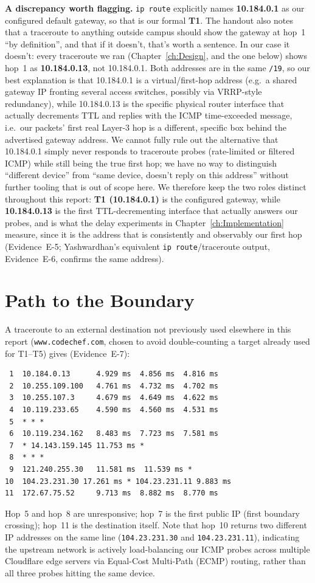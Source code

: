 \textbf{A discrepancy worth flagging.} \texttt{ip route} explicitly names \textbf{10.184.0.1} as
our configured default gateway, so that is our formal \textbf{T1}. The handout also notes that a
traceroute to anything outside campus should show the gateway at hop~1 ``by definition'', and
that if it doesn't, that's worth a sentence. In our case it doesn't: every traceroute we ran
(Chapter~\ref{ch:Design}, and the one below) shows hop~1 as \textbf{10.184.0.13}, not 10.184.0.1.
Both addresses are in the same \texttt{/19}, so our best explanation is that 10.184.0.1 is a
virtual/first-hop address (e.g.\ a shared gateway IP fronting several access switches, possibly
via VRRP-style redundancy), while 10.184.0.13 is the specific physical router interface that
actually decrements TTL and replies with the ICMP time-exceeded message, i.e.\ our packets' first
real Layer-3 hop is a different, specific box behind the advertised gateway address. We cannot
fully rule out the alternative that 10.184.0.1 simply never responds to traceroute probes
(rate-limited or filtered ICMP) while still being the true first hop; we have no way to
distinguish ``different device'' from ``same device, doesn't reply on this address'' without
further tooling that is out of scope here. We therefore keep the two roles distinct throughout
this report: \textbf{T1 (10.184.0.1)} is the configured gateway, while \textbf{10.184.0.13} is
the first TTL-decrementing interface that actually answers our probes, and is what the delay
experiments in Chapter~\ref{ch:Implementation} measure, since it is the address that is
consistently and observably our first hop (Evidence~E-5; Yashwardhan's equivalent
\texttt{ip route}/traceroute output, Evidence~E-6, confirms the same address).

\section{Path to the Boundary}
A traceroute to an external destination not previously used elsewhere in this report
(\texttt{www.codechef.com}, chosen to avoid double-counting a target already used for T1--T5)
gives (Evidence~E-7):
\footnotesize
\begin{verbatim}
 1  10.184.0.13      4.929 ms  4.856 ms  4.816 ms
 2  10.255.109.100   4.761 ms  4.732 ms  4.702 ms
 3  10.255.107.3     4.679 ms  4.649 ms  4.622 ms
 4  10.119.233.65    4.590 ms  4.560 ms  4.531 ms
 5  * * *
 6  10.119.234.162   8.483 ms  7.723 ms  7.581 ms
 7  * 14.143.159.145 11.753 ms *
 8  * * *
 9  121.240.255.30   11.581 ms  11.539 ms *
10  104.23.231.30 17.261 ms * 104.23.231.11 9.883 ms
11  172.67.75.52     9.713 ms  8.882 ms  8.770 ms
\end{verbatim}
\normalsize
Hop~5 and hop~8 are unresponsive; hop~7 is the first public IP (first boundary
crossing); hop~11 is the destination itself. Note that hop~10 returns two different IP
addresses on the same line (\texttt{104.23.231.30} and \texttt{104.23.231.11}), indicating the
upstream network is actively load-balancing our ICMP probes across multiple Cloudflare edge
servers via Equal-Cost Multi-Path (ECMP) routing, rather than all three probes hitting the same
device.

